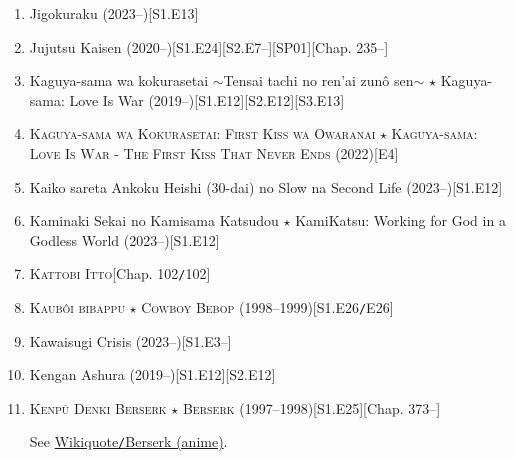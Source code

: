 \documentclass{article}
\begin{document}
\begin{enumerate}
    \item Jigokuraku (2023--)\hfill[S1.E13]
    \item Jujutsu Kaisen (2020--)\hfill[S1.E24][S2.E7--][SP01][Chap. 235--]
    \item Kaguya-sama wa kokurasetai $\sim$Tensai tachi no ren'ai zun\^o sen$\sim$ $\star$ Kaguya-sama: Love Is War (2019--)\hfill[S1.E12][S2.E12][S3.E13]
    \item \textsc{Kaguya-sama wa Kokurasetai: First Kiss wa Owaranai $\star$ Kaguya-sama: Love Is War - The First Kiss That Never Ends} (2022)\hfill[E4]
    \item Kaiko sareta Ankoku Heishi (30-dai) no Slow na Second Life (2023--)\hfill[S1.E12]
    \item Kaminaki Sekai no Kamisama Katsudou $\star$ KamiKatsu: Working for God in a Godless World (2023--)\hfill[S1.E12]
    \item \textsc{Kattobi Itto}\hfill[Chap. 102\texttt{/}102]
    \item \textsc{Kaub\^oi bibappu $\star$ Cowboy Bebop} (1998--1999)\hfill[S1.E26\texttt{/}E26]
    \item Kawaisugi Crisis (2023--)\hfill[S1.E3--]
    \item Kengan Ashura (2019--)\hfill[S1.E12][S2.E12]
    \item \textsc{Kenp\^u Denki Berserk $\star$ Berserk} (1997--1998)\hfill[S1.E25][Chap. 373--]
    
    See \href{https://en.wikiquote.org/wiki/Berserk_(anime)}{Wikiquote\texttt{/}Berserk (anime)}.
    

\end{enumerate}
\end{document}
